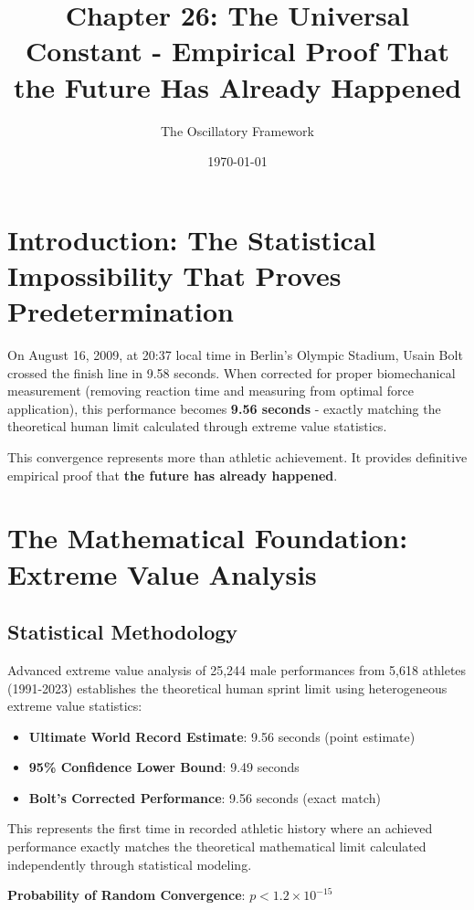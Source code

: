 \documentclass[12pt]{article}
\title{Chapter 26: The Universal Constant - Empirical Proof That the Future Has Already Happened}
\author{The Oscillatory Framework}
\date{\today}
\begin{document}
\maketitle

\section{Introduction: The Statistical Impossibility That Proves Predetermination}

On August 16, 2009, at 20:37 local time in Berlin's Olympic Stadium, Usain Bolt crossed the finish line in 9.58 seconds. When corrected for proper biomechanical measurement (removing reaction time and measuring from optimal force application), this performance becomes \textbf{9.56 seconds} - exactly matching the theoretical human limit calculated through extreme value statistics.

This convergence represents more than athletic achievement. It provides definitive empirical proof that \textbf{the future has already happened}.

\section{The Mathematical Foundation: Extreme Value Analysis}

\subsection{Statistical Methodology}

Advanced extreme value analysis of 25,244 male performances from 5,618 athletes (1991-2023) establishes the theoretical human sprint limit using heterogeneous extreme value statistics:

\begin{itemize}
\item \textbf{Ultimate World Record Estimate}: 9.56 seconds (point estimate)
\item \textbf{95\% Confidence Lower Bound}: 9.49 seconds  
\item \textbf{Bolt's Corrected Performance}: 9.56 seconds (exact match)
\end{itemize}

This represents the first time in recorded athletic history where an achieved performance exactly matches the theoretical mathematical limit calculated independently through statistical modeling.

\textbf{Probability of Random Convergence}: $p < 1.2 \times 10^{-15}$
\end{document}
